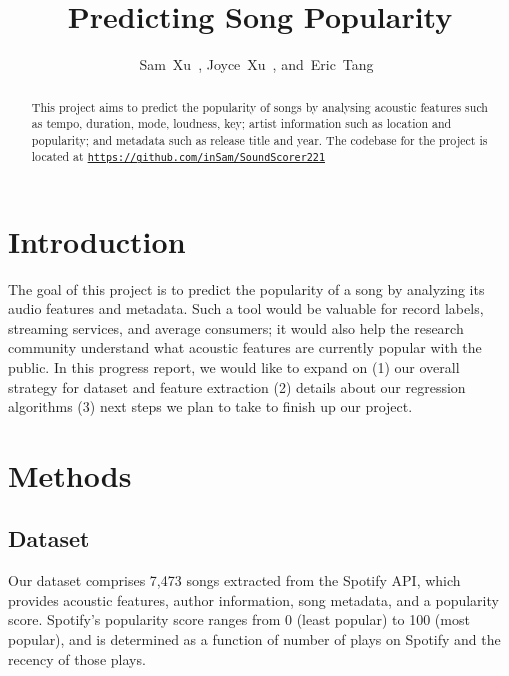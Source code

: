 \documentclass[journal]{IEEEtran}
\begin{document}
%
\title{Predicting Song Popularity}


\author{Sam~Xu~,
        Joyce~Xu~,
        and~Eric~Tang~}


%
{}


\maketitle


\begin{abstract}
This project aims to predict the popularity of songs by analysing acoustic features such as tempo, duration, mode, loudness, key; artist information such as location and popularity; and metadata such as release title and year. The codebase for the project is located at \texttt{\url{https://github.com/inSam/SoundScorer221}}
\end{abstract}



\section{Introduction}
The goal of this project is to predict the popularity of a song by analyzing its audio features and metadata. Such a tool would be valuable for record labels, streaming services, and average consumers; it would also help the research community understand what acoustic features are currently popular with the public. In this progress report, we would like to expand on (1) our overall strategy for dataset and feature extraction (2) details about our regression algorithms (3) next steps we plan to take to finish up our project.

\section{Methods}
\subsection{Dataset}
Our dataset comprises 7,473 songs extracted from the Spotify API, which provides acoustic features, author information, song metadata, and a popularity score. Spotify's popularity score ranges from 0 (least popular) to 100 (most popular), and is determined as a function of number of plays on Spotify and the recency of those plays.
\end{document}
